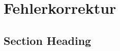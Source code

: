 \chapter{Fehlerkorrektur}
\label{error_correction} %



\section{Section Heading}


\printbibliography
